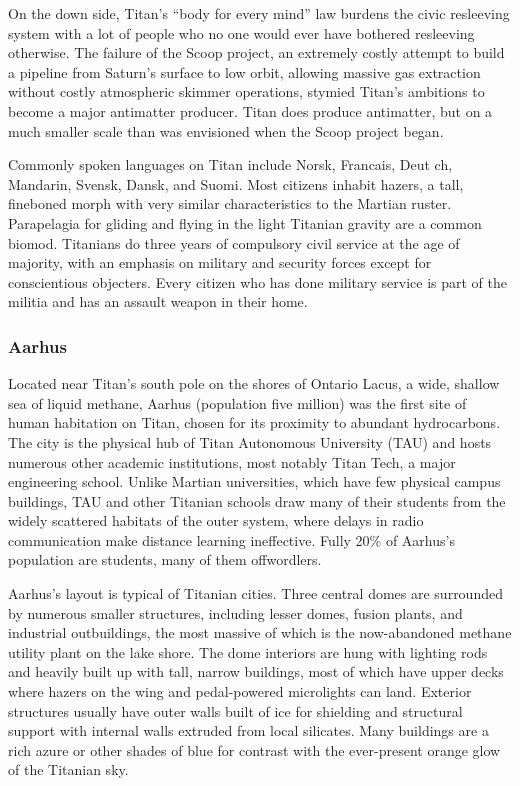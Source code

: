 On the down side, Titan's “body for every mind” law burdens the civic resleeving system with a lot of people who no one would ever have bothered resleeving otherwise. The failure of the Scoop project, an extremely costly attempt to build a pipeline from Saturn's surface to low orbit, allowing massive gas extraction without costly atmospheric skimmer operations, stymied Titan's ambitions to become a major antimatter producer. Titan does produce antimatter, but on a much smaller scale than was envisioned when the Scoop project began. 

Commonly spoken languages on Titan include Norsk, Francais, Deut ch, Mandarin, Svensk, Dansk, and Suomi. Most citizens inhabit hazers, a tall, fineboned morph with very similar characteristics to the Martian ruster. Parapelagia for gliding and flying in the light Titanian gravity are a common biomod. Titanians do three years of compulsory civil service at the age of majority, with an emphasis on military and security forces except for conscientious objecters. Every citizen who has done military service is part of the militia and has an assault weapon in their home. 

\subsubsection{Aarhus} \label{sec:aarhus} 

Located near Titan's south pole on the shores of Ontario Lacus, a wide, shallow sea of liquid methane, Aarhus (population five million) was the first site of human habitation on Titan, chosen for its proximity to abundant hydrocarbons. The city is the physical hub of Titan Autonomous University (TAU) and hosts numerous other academic institutions, most notably Titan Tech, a major engineering school. Unlike Martian universities, which have few physical campus buildings, TAU and other Titanian schools draw many of their students from the widely scattered habitats of the outer system, where delays in radio communication make distance learning ineffective. Fully 20\% of Aarhus's population are students, many of them offwordlers. 

Aarhus's layout is typical of Titanian cities. Three central domes are surrounded by numerous smaller structures, including lesser domes, fusion plants, and industrial outbuildings, the most massive of which is the now-abandoned methane utility plant on the lake shore. The dome interiors are hung with lighting rods and heavily built up with tall, narrow buildings, most of which have upper decks where hazers on the wing and pedal-powered microlights can land. Exterior structures usually have outer walls built of ice for shielding and structural support with internal walls extruded from local silicates. Many buildings are a rich azure or other shades of blue for contrast with the ever-present orange glow of the Titanian sky. 

